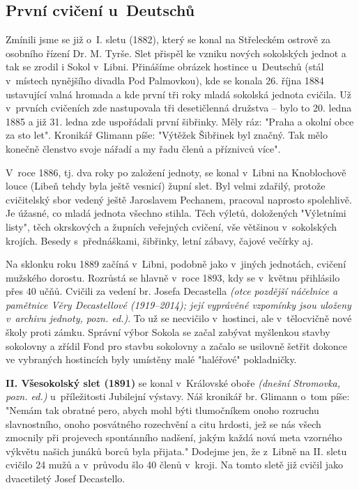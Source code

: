 \documentclass[a5paper, 12pt, twoside]{article}
\newcommand{\pozned}[1]{%
\textit{#1}}
\begin{document}
\subsection{První cvičení u~Deutschů}
Zmínili jsme se již o~I. sletu (1882), který se konal na Střeleckém ostrově za osobního řízení Dr. M. Tyrše. Slet přispěl ke vzniku nových sokolských jednot a tak se zrodil i Sokol v~Libni. Přinášíme obrázek hostince u~Deutschů (stál v~místech nynějšího divadla Pod Palmovkou), kde se konala 26. října 1884 ustavující valná hromada a kde první tři roky mladá sokolská jednota cvičila. Už v~prvních cvičeních zde nastupovala tři desetičlenná družstva – bylo to 20. ledna 1885 a již 31. ledna zde uspořádali první šibřinky. Měly ráz: "Praha a okolní obce za sto let". Kronikář Glimann píše: "Výtěžek Šibřinek byl značný. Tak mělo konečně členstvo svoje nářadí a my řadu členů a příznivců více".

V~roce 1886, tj. dva roky po založení jednoty, se konal v~Libni na Knoblochově louce (Libeň tehdy byla ještě vesnicí) župní slet. Byl velmi zdařilý, protože cvičitelský sbor vedený ještě Jaroslavem Pechanem, pracoval naprosto spolehlivě. Je úžasné, co mladá jednota všechno stihla. Těch výletů, doložených "Výletními listy", těch okrskových a župních veřejných cvičení, vše většinou v~sokolských krojích. Besedy s~přednáškami, šibřinky, letní zábavy, čajové večírky aj.


Na sklonku roku 1889 začíná v~Libni, podobně jako v~jiných jednotách, cvičení mužského dorostu. Rozrůstá se hlavně v~roce 1893, kdy se v~květnu přihlásilo přes 40 učňů. Cvičili za vedení br. Josefa Decastella \pozned{(otce pozdější náčelnice a pamětnice Věry Decastellové (1919–2014); její vyprávěné vzpomínky jsou uloženy v~archivu jednoty, pozn. ed.)}. To už se necvičilo v~hostinci, ale v~tělocvičně nové školy proti zámku. Správní výbor Sokola se začal zabývat myšlenkou stavby sokolovny a zřídil Fond pro stavbu sokolovny a začalo se usilovně šetřit dokonce ve vybraných hostincích byly umístěny malé "haléřové" pokladničky.

\textbf{II. Všesokolský slet (1891)} se konal v~Královské oboře \pozned{(dnešní Stromovka, pozn. ed.)} u~příležitosti Jubilejní výstavy. Náš kronikář br. Glimann o~tom píše: "Nemám tak obratné pero, abych mohl býti tlumočníkem onoho rozruchu slavnostního, onoho posvátného rozechvění a citu hrdosti, jež se nás všech zmocnily při projevech spontánního nadšení, jakým každá nová meta vzorného výkvětu našich junáků borců byla přijata." Dodejme jen, že z~Libně na II. sletu cvičilo 24 mužů a v~průvodu šlo 40 členů v~kroji. Na tomto sletě již cvičil jako dvacetiletý Josef Decastello.
\end{document}
